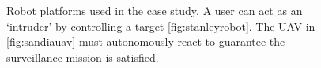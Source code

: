 \begin{figure}
	\centering
{} \hspace{0.05\linewidth}

\caption{Robot platforms used in the case study. A user can act as an `intruder' by controlling a target \ref{fig:stanleyrobot}. The UAV in \ref{fig:sandiauav} must autonomously react to guarantee the surveillance mission is satisfied. }
\label{fig:SandiaCaseSTudy}
\end{figure}